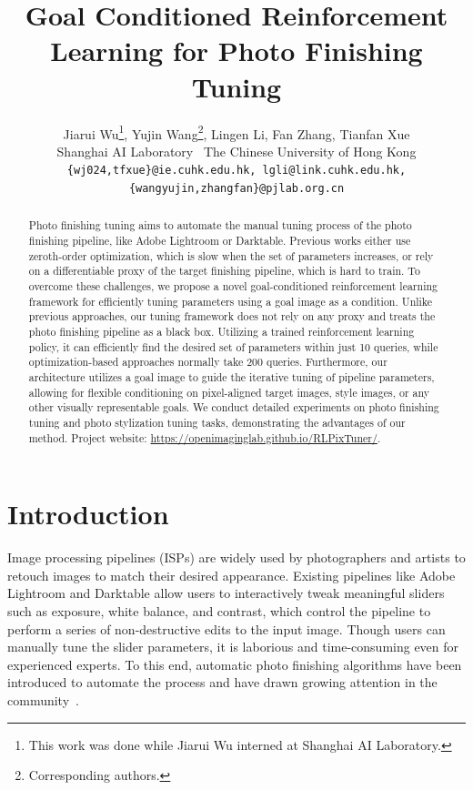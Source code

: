 \documentclass{article}
\title{Goal Conditioned Reinforcement Learning for Photo Finishing Tuning}
\author{%
  Jiarui Wu\pjlab\affspace\cuhk\thanks{This work was done while Jiarui Wu interned at Shanghai AI Laboratory.}\hspace{4pt},
  Yujin Wang\pjlab\thanks{Corresponding authors.}\hspace{4pt},
  Lingen Li\pjlab\affspace\cuhk,
  Fan Zhang\pjlab,
  Tianfan Xue\cuhk
  \vspace{5pt}
  \\
  \pjlab Shanghai AI Laboratory \ \cuhk The Chinese University of Hong Kong \vspace{2pt} \\
   \texttt{\{wj024,tfxue\}@ie.cuhk.edu.hk, lgli@link.cuhk.edu.hk,} \\  
   \texttt{\{wangyujin,zhangfan\}@pjlab.org.cn} \\
}
\begin{document}
\maketitle
\vspace{-10pt}
\begin{abstract}


Photo finishing tuning aims to automate the manual tuning process of the photo finishing pipeline, like Adobe Lightroom or Darktable. Previous works either use zeroth-order optimization, which is slow when the set of parameters increases, or rely on a differentiable proxy of the target finishing pipeline, which is hard to train.
To overcome these challenges, we propose a novel goal-conditioned reinforcement learning framework for efficiently tuning parameters using a goal image as a condition. Unlike previous approaches, our tuning framework does not rely on any proxy and treats the photo finishing pipeline as a black box. Utilizing a trained reinforcement learning policy, it can efficiently find the desired set of parameters within just 10 queries, while optimization-based approaches normally take 200 queries. Furthermore, our architecture utilizes a goal image to guide the iterative tuning of pipeline parameters, allowing for flexible conditioning on pixel-aligned target images, style images, or any other visually representable goals. We conduct detailed experiments on photo finishing tuning and photo stylization tuning tasks, demonstrating the advantages of our method.
Project website: \href{https://openimaginglab.github.io/RLPixTuner/}{https://openimaginglab.github.io/RLPixTuner/}.

\end{abstract}




\vspace{-10pt}
\section{Introduction}


Image processing pipelines (ISPs) are widely used by photographers and artists to retouch images to match their desired appearance. Existing pipelines like Adobe Lightroom and Darktable allow users to interactively tweak meaningful sliders such as exposure, white balance, and contrast, which control the pipeline to perform a series of non-destructive edits to the input image. Though users can manually tune the slider parameters, it is laborious and time-consuming even for experienced experts. To this end, automatic photo finishing algorithms have been introduced to automate the process and have drawn growing attention in the community~\cite{hu2018exposure}.
\end{document}
